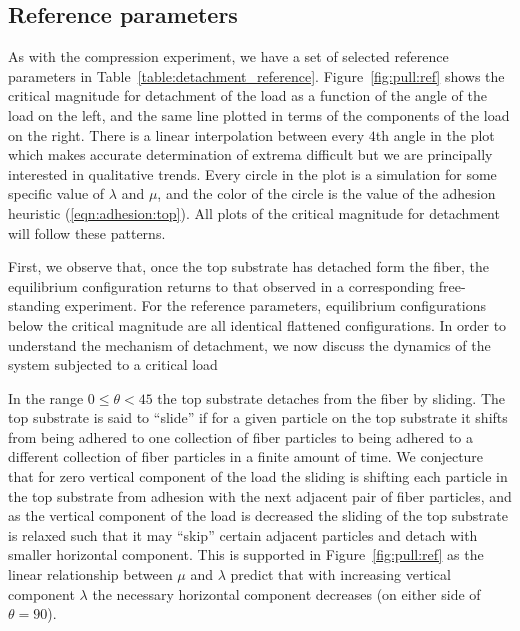 \subsection{Reference parameters}

As with the compression experiment, we have a set of selected reference parameters in Table~\ref{table:detachment_reference}. Figure~\ref{fig:pull:ref} shows the critical magnitude for detachment of the load as a function of the angle of the load on the left, and the same line plotted in terms of the components of the load on the right. There is a linear interpolation between every $4$th angle in the plot which makes accurate determination of extrema  difficult but we are principally interested in qualitative trends. Every circle in the plot is a simulation for some specific value of $\lambda$ and $\mu$, and the color of the circle is the value of the adhesion heuristic (\ref{eqn:adhesion:top}). All plots of the critical magnitude for detachment will follow these patterns.

First, we observe that, once the top substrate has detached form the fiber, the equilibrium configuration returns to that observed in a corresponding free-standing experiment.
For the reference parameters, equilibrium configurations below the critical magnitude are all identical flattened configurations. In order to understand the mechanism of detachment, we now discuss the dynamics of the system subjected to a critical load

In the range $0 \leq \theta < 45$ the top substrate detaches from the fiber by sliding. The top substrate is said to ``slide'' if for a given particle on the top substrate it shifts from being adhered to one collection of fiber particles to being adhered to a different collection of fiber particles in a finite amount of time. We conjecture that for zero vertical component of the load the sliding is shifting each particle in the top substrate from adhesion with the next adjacent pair of fiber particles, and as the vertical component of the load is decreased the sliding of the top substrate is relaxed such that it may ``skip'' certain adjacent particles and detach with smaller horizontal component. This is supported in Figure~\ref{fig:pull:ref} as the linear relationship between $\mu$ and $\lambda$ predict that with increasing vertical component $\lambda$ the necessary horizontal component decreases (on either side of $\theta = 90$\textdegree).

